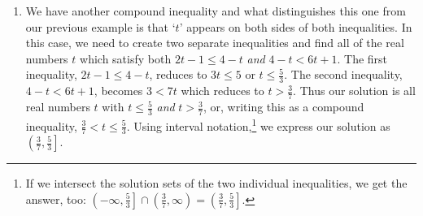 \documentclass{ximera}
\begin{document}
\begin{example}
\begin{enumerate}
\[\begin{array}{rclr}
 \frac{3}{4} \leq &  \frac{7-y}{2} & < 6 & \\  

4\left( \frac{3}{4} \right) \leq & 4\left(  \frac{7-y}{2}\right) & < 4(6) & \text{Multiply by $4$} \\  

 \frac{\cancel{4} \cdot 3}{\cancel{4}} \leq &  \frac{\cancelto{2}{4}(7-y)}{\cancel{2}} &  < 24 & \\  

3 \leq & 2(7-y) & < 24 & \\

3 \leq & 2(7)-2y & < 24 & \text{Distrbute}\\

3 \leq & 14-2y & < 24 & \\

3 -14 \leq & (14-2y) - 14 & < 24 - 14 & \text{Subtract $14$}\\

-11 \leq & -2y & < 10 & \\  

 \frac{-11}{-2} \geq &  \frac{-2y}{-2} & >  \frac{10}{-2} & \text{Divide by the coefficient of $y$} \\  
                     &                 &                  & \text{Reverse inequalities} \\  

 \frac{11}{2}  \geq & y & > -5 & \\

\end{array} \]

Our final answer is $\frac{11}{2} \geq y > -5$, or, said differently,  $-5 < y \leq \frac{11}{2}$. In interval notation, this is $\left( -5, \frac{11}{2} \right]$.  We could check the reasonableness of our answer as before, and the reader is encouraged to do so.  

\item  We have another compound inequality and what distinguishes this one from our previous example is that `$t$' appears on both sides of both inequalities.  In this case, we need to create two separate inequalities and find all of the real numbers $t$ which satisfy both  $2t-1 \leq 4-t$ \textit{and} $4-t < 6t + 1$.  The first inequality, $2t-1 \leq 4-t$, reduces to $3t \leq 5$ or $t \leq \frac{5}{3}$.  The second inequality, $4-t < 6t+1$, becomes $3 < 7t$  which reduces to $t > \frac{3}{7}$.  Thus our solution is all real numbers $t$ with $t \leq \frac{5}{3}$ \textit{and}  $t > \frac{3}{7}$, or, writing this as a compound inequality,  $\frac{3}{7} < t \leq \frac{5}{3}$. Using interval notation,\footnote{If we intersect the solution sets of the two individual inequalities, we get the answer, too:  $\left(-\infty, \frac{5}{3}\right] \cap \left(\frac{3}{7}, \infty\right) = \left( \frac{3}{7}, \frac{5}{3} \right]$.} we express our solution as $\left( \frac{3}{7}, \frac{5}{3} \right]$.



\end{enumerate}
\end{example}
\end{document}
